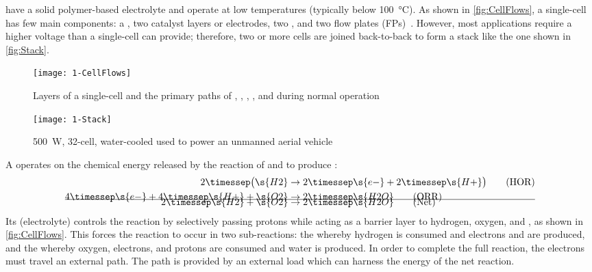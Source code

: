  have a solid polymer-based electrolyte and operate at low temperatures (typically below \SI{100}{\celsius}).  As shown in \autoref{fig:CellFlows}, a single-cell  has few main components: a , two catalyst layers or electrodes, two , and two flow plates (FPs)~\cite{Larminie2003}. %
However, most applications require a higher voltage than a single-cell  can provide; therefore, two or more cells are joined back-to-back to form a  stack like the one shown in \autoref{fig:Stack}.

\begin{figure}[htbp]
  \texttt{[image: 1-CellFlows]}%
  \caption[Layers of a single-cell ]{%
  Layers of a single-cell  and the primary paths of , , , , and  during normal operation}%
  \label{fig:CellFlows}
\end{figure}

\begin{figure}[hbtp]
  \texttt{[image: 1-Stack]}%
  \caption[ used to power an unmanned aerial vehicle]{\SI{500}{W}, 32-cell, water-cooled  used to power an unmanned aerial vehicle~}%
  \label{fig:Stack}
\end{figure}

A  operates on the chemical energy released by the reaction of  and  to produce :
\begin{subequations}
  \begin{align}
    2\timessep\big(\s{H2} &\rightarrow 2\timessep\s{e-} + 2\timessep\s{H+}\big)\tag{HOR}\label{eq:HOR}\\
    4\timessep\s{e-} + 4\timessep\s{H+} + \s{O2} &\rightarrow 2\timessep\s{H2O}\tag{ORR}\label{eq:ORR}\\[-1.5em]
    \cline{1-2}\noalign{\vskip -0.9em}
    2\timessep\s{H2} + \s{O2} &\rightarrow 2\timessep\s{H2O}\tag{Net}\label{eq:CellReaction}
  \end{align}
\end{subequations}
Its  (electrolyte) controls the reaction by selectively passing protons while acting as a barrier layer to hydrogen, oxygen, and , as shown in \autoref{fig:CellFlows}.  This forces the reaction to occur in two sub-reactions:  the  whereby hydrogen is consumed and electrons and  are produced, and the  whereby oxygen, electrons, and protons are consumed and water is produced.  In order to complete the full reaction, the electrons must travel an external path.  The path is provided by an external load which can harness the energy of the net reaction.

